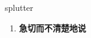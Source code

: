 
\begin{frame}
{\huge splutter}
\begin{center}
\begin{enumerate}\Large
  \item \textbf{急切而不清楚地说}
\end{enumerate}
\end{center}
\end{frame}
